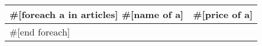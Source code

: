 \documentclass{article}
\begin{document}
\begin{center}
    \begin{tabular}{ l r }
        \hline
        #[foreach a in articles]
        #[name of a] & #[price of a] \\ \hline
        #[end foreach]
        \hline
    \end{tabular}
\end{center}
\end{document}
